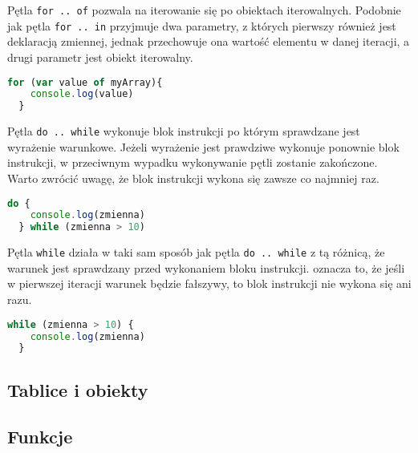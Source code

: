 \par Pętla \texttt{for .. of} pozwala na iterowanie się po obiektach iterowalnych. Podobnie jak pętla \texttt{for .. in} przyjmuje dwa parametry, z których pierwszy również jest deklaracją zmiennej, jednak przechowuje ona wartość elementu w danej iteracji, a drugi parametr jest obiekt iterowalny.

\begin{lstlisting}[language=JavaScript, caption=Przykład użycia instrukcji \texttt{for .. of}, label=alg:instrukcjaFor3]
  for (var value of myArray){
    console.log(value)
  }
\end{lstlisting}

\par Pętla \texttt{do .. while} wykonuje blok instrukcji po którym sprawdzane jest wyrażenie warunkowe. Jeżeli wyrażenie jest prawdziwe wykonuje ponownie blok instrukcji, w przeciwnym wypadku wykonywanie pętli zostanie zakończone. Warto zwrócić uwagę, że blok instrukcji wykona się zawsze co najmniej raz.

\begin{lstlisting}[language=JavaScript, caption=Przykład użycia instrukcji \texttt{do .. while}, label=alg:instrukcjaWhile1]
  do {
    console.log(zmienna)
  } while (zmienna > 10)
\end{lstlisting}

\par Pętla \texttt{while} działa w taki sam sposób jak pętla \texttt{do .. while} z tą różnicą, że warunek jest sprawdzany przed wykonaniem bloku instrukcji. oznacza to, że jeśli w pierwszej iteracji warunek będzie fałszywy, to blok instrukcji nie wykona się ani razu.

\begin{lstlisting}[language=JavaScript, caption=Przykład użycia instrukcji \texttt{while}, label=alg:instrukcjaWhile2]
  while (zmienna > 10) {
    console.log(zmienna)
  }
\end{lstlisting}


\subsection{Tablice i obiekty}

\subsection{Funkcje}

